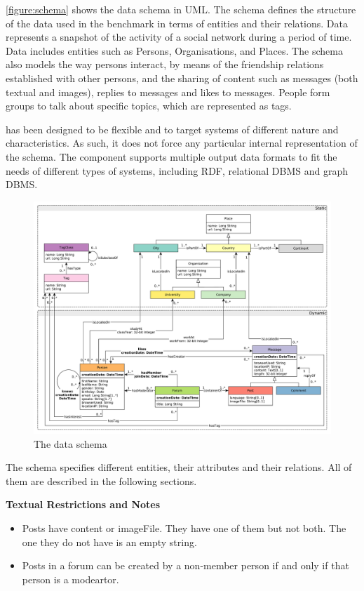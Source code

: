 \autoref{figure:schema} shows the data schema in UML. The schema defines the
structure of the data used in the benchmark in terms of entities and their
relations. Data represents a snapshot of the activity of a social network
during a period of time. Data includes entities such as Persons, Organisations,
and Places. The schema also models the way persons interact, by means of the
friendship relations established with other persons, and the sharing of content
such as messages (both textual and images), replies to messages and likes to
messages.  People form groups to talk about specific topics, which are
represented as tags.

\ldbcsnb has been designed to be flexible and to target systems of different
nature and characteristics. As such, it does not force any particular internal
representation of the schema. The \datagen component
supports multiple output data formats to
fit the needs of different types of systems, including RDF, relational DBMS and
graph DBMS.

\begin{figure}[htbp]
	\centering
	\includegraphics[width=\linewidth]{figures/schema-comfortable}
	\caption{The \ldbcsnb data schema}
	\label{figure:schema}
\end{figure}

The schema specifies different entities, their attributes and their relations.
All of them are described in the following sections.

{\flushleft \textbf{Textual Restrictions and Notes}}
\begin{itemize}
    \item Posts have content or imageFile. They have one of them but not both. The one they do not have is an empty string.
    \item Posts in a forum can be created by a non-member person if and only if that person is a modeartor.
\end{itemize}

